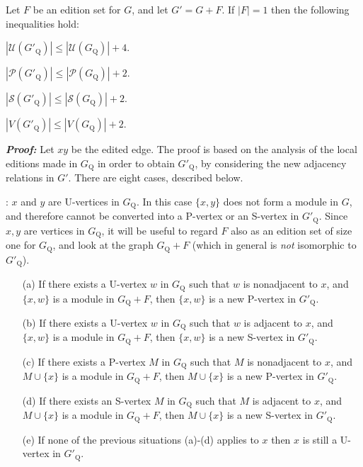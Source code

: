 \documentclass[12pt]{article}
\begin{document}
\begin{lema} \label{1edicao-quociente}
Let $F$ be an edition set for $G$, and let $G'=G+F$.
If $|F|=1$ then the following inequalities hold:

 $|{\mathcal U}(G'_{\mathrm Q})| \leq |{\mathcal U}(G_{\mathrm Q})|+4$.

 $|{\mathcal P}(G'_{\mathrm Q})| \leq |{\mathcal P}(G_{\mathrm Q})|+2$.

 $|{\mathcal S}(G'_{\mathrm Q})| \leq |{\mathcal S}(G_{\mathrm Q})|+2$.

 $|V(G'_{\mathrm Q})|   \leq |V(G_{\mathrm Q})|+2$.
\end{lema}

\noindent \emph{\textbf{Proof:}} Let $x y$ be the edited
edge. The proof is based on the analysis of the local editions
made in $G_{\mathrm Q}$ in order to obtain $G'_{\mathrm Q}$, by
considering the new adjacency relations in $G'$. There are eight
cases, described below.

\medskip

: $x$ and $y$ are U-vertices in $G_{\mathrm
Q}$. In this case $\{x,y\}$ does not form a module in $G$, and
therefore cannot be converted into a P-vertex or an S-vertex in
$G'_{\mathrm Q}$. Since $x, y$ are vertices in $G_{\mathrm Q}$, it
will be useful to regard $F$ also as an edition set of size
one for $G_{\mathrm Q}$, and look at the graph $G_{\mathrm Q} + F$
(which in general is \emph{not} isomorphic to $G'_{\mathrm Q}$).

\medskip

\begin{itemize}

\item[(a)] If there exists a U-vertex $w$ in $G_{\mathrm Q}$ such
that $w$ is nonadjacent to $x$, and $\{x,w\}$ is a module in
$G_{\mathrm Q}+F$, then $\{x,w\}$ is a new P-vertex in
$G'_{\mathrm Q}$.


\item[(b)] If there exists a U-vertex $w$ in $G_{\mathrm Q}$ such
that $w$ is adjacent to $x$, and $\{x,w\}$ is a module in
$G_{\mathrm Q}+F$, then $\{x,w\}$ is a new S-vertex in
$G'_{\mathrm Q}$.


\item[(c)] If there exists a P-vertex $M$ in $G_{\mathrm Q}$ such
that $M$ is nonadjacent to $x$, and $M \cup \{x\}$ is a module in
$G_{\mathrm Q}+F$, then $M \cup \{x\}$ is a new P-vertex in
$G'_{\mathrm Q}$.


\item[(d)] If there exists an S-vertex $M$ in $G_{\mathrm Q}$ such
that $M$ is adjacent to $x$, and $M \cup \{x\}$ is a module in
$G_{\mathrm Q}+F$, then $M \cup \{x\}$ is a new S-vertex in
$G'_{\mathrm Q}$.


\item[(e)] If none of the previous situations (a)-(d) applies to
$x$ then $x$ is still a U-vertex in $G'_{\mathrm Q}$.

\end{itemize}
\end{document}
